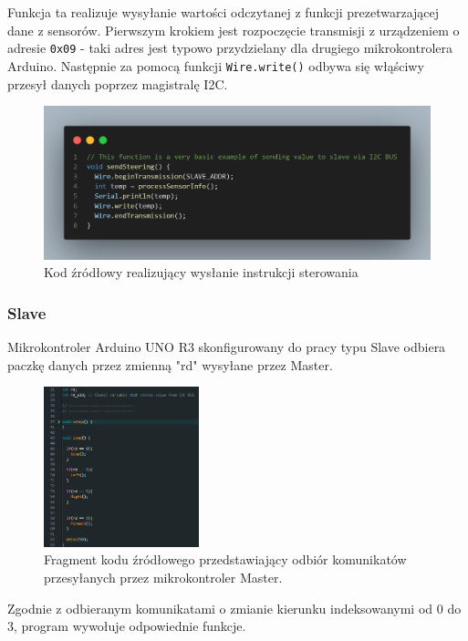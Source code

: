 \documentclass{report}
\begin{document}
Funkcja ta realizuje wysyłanie wartości odczytanej z funkcji prezetwarzającej dane z sensorów. Pierwszym krokiem jest rozpoczęcie transmisji z urządzeniem o adresie \texttt{0x09} - taki adres jest typowo przydzielany dla drugiego mikrokontrolera Arduino. Następnie za pomocą funkcji \texttt{Wire.write()} odbywa się włąściwy przesył danych poprzez magistralę I2C.

\begin{figure}[H]
    \centering
    \includegraphics[width=1.0\textwidth]{src/code_snaps/sendSteer.png}
    \caption{Kod źródłowy realizujący wysłanie instrukcji sterowania}
\end{figure}

\subsubsection{\Large Slave}

Mikrokontroler Arduino UNO R3 skonfigurowany do pracy typu Slave odbiera paczkę danych przez zmienną "rd" wysyłane przez Master.

\begin{figure}[H]
    \centering
    \includegraphics*[width=0.4\textwidth]{"src/code_snaps/Comunication_slave.png"}
    \caption{Fragment kodu źródłowego przedstawiający odbiór komunikatów przesyłanych przez mikrokontroler Master.}
    \label{fig:sensor_init}
\end{figure}

Zgodnie z odbieranym komunikatami o zmianie kierunku indeksowanymi od 0 do 3, program wywołuje odpowiednie funkcje. 
\end{document}

